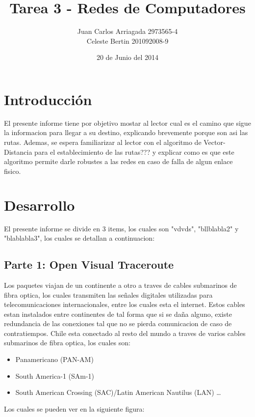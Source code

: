 \documentclass{article}
\title{Tarea 3 - Redes de Computadores}
\author{Juan Carlos Arriagada 2973565-4\\Celeste Bertin 201092008-9}
\date{20 de Junio del 2014}
\begin{document}
\maketitle

\section{Introducción}
El presente informe tiene por objetivo mostar al lector cual es el camino que sigue la informacion para llegar a su destino, explicando brevemente porque son asi las rutas. Ademas, se espera familiarizar al lector con el algoritmo de Vector-Distancia para el establecimiento de las rutas??? y explicar como es que este algoritmo permite darle robustes a las redes en caso de falla de algun enlace fisico.

\section{Desarrollo}
El presente informe se divide en 3 items, los cuales son "vdvds", "bllblabla2" y "blablabla3", los cuales se detallan a continuacion:

\subsection{Parte 1: Open Visual Traceroute }
Los paquetes viajan de un continente a otro a traves de cables submarinos de fibra optica, los cuales transmiten las señales digitales utilizadas para telecomunicaciones internacionales, entre los cuales esta el internet. Estos cables estan instalados entre continentes de tal forma que si se daña alguno, existe redundancia de las conexiones tal que no se pierda comunicacion de caso de contratiempos. 
Chile esta conectado al resto del mundo a traves de varios cables submarinos de fibra optica\citep{website:telegeography}, los cuales son:
\begin{itemize}
  \item Panamericano (PAN-AM)
  \item South America-1 (SAm-1)
  \item South American Crossing (SAC)/Latin American Nautilus (LAN) \ldots
\end{itemize}

Los cuales se pueden ver en la siguiente figura:
\clearpage
\end{document}

